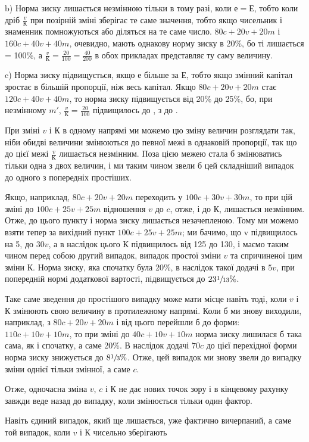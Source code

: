 
b) Норма зиску лишається незмінною тільки в тому разі, коли
$е = Е$, тобто коли дріб $\frac{v}{К}$ при позірній зміні зберігає те саме
значення, тобто якщо чисельник і знаменник помножуються або
діляться на те саме число. $80 c + 20 v + 20 m$ і $160 c + 40 v + 40 m$,
очевидно, мають однакову норму зиску в 20\%, бо ті лишається
= 100\%, а $\frac{v}{К} = \frac{20}{100} = \frac{40}{200}$ в обох прикладах
представляє ту саму величину.

c) Норма зиску підвищується, якщо $е$ більше за $Е$, тобто
якщо змінний капітал зростає в більшій пропорції, ніж весь капітал.
Якщо $80c + 20v + 20m$ стає $120 c + 40 v + 40 m$, то норма
зиску підвищується від 20\% до 25\%, бо, при незмінному $m'$,
$\frac{v}{К} = \frac{20}{100}$ підвищилось до , з 
до .

При зміні $v$ і $К$ в одному напрямі ми можемо цю зміну величин
розглядати так, ніби обидві величини змінюються до певної
межі в однаковій пропорції, так що до цієї межі $\frac{v}{К}$ лишається
незмінним. Поза цією межею стала б змінюватись тільки
одна з двох величин, і ми таким чином звели б цей складніший
випадок до одного з попередніх простіших.

Якщо, наприклад, $80 c + 20 v + 20 m$ переходить у
$100 c + 30 v + 30 m$, то при цій зміні до $100c + 25v + 25m$ відношення
$v$ до $c$, отже, і до $К$, лишається незмінним. Отже, до цього
пункту і норма зиску лишається незачепленою. Тому ми можемо
взяти тепер за вихідний пункт $100 c + 25v + 25m$; ми бачимо,
що v підвищилось на 5, до $30v$, а в наслідок цього $К$ підвищилось
від 125 до 130, і маємо таким чином перед собою другий
випадок, випадок простої зміни $v$ та спричиненої цим
зміни $К$. Норма зиску, яка спочатку була 20\%, в наслідок такої
додачі в $5v$, при попередній нормі додаткової вартості, підвищується
до $23\sfrac{1}{13}\%$.

Таке саме зведення до простішого випадку може мати місце
навіть тоді, коли $v$ і $К$ змінюють свою величину в протилежному
напрямі. Коли б ми знову виходили, наприклад, з
$80c + 20v + 20m$ і від цього перейшли б до форми: $110c + 10v + 10m$, то
при зміні до $40c + 10v + 10m$ норма зиску лишилася б така
сама, як і спочатку, а саме 20\%. В наслідок додачі $70c$ до цієї
перехідної форми норма зиску знижується до $8\sfrac{1}{3}\%$. Отже, цей
випадок ми знову звели до випадку зміни однієї тільки змінної,
а саме $c$.

Отже, одночасна зміна $v$, $c$ і $К$ не дає нових точок зору і в
кінцевому рахунку завжди веде назад до випадку, коли змінюється
тільки один фактор.

Навіть єдиний випадок, який ще лишається, уже фактично
вичерпаний, а саме той випадок, коли $v$ і $К$ чисельно зберігають
\parbreak{}  %

